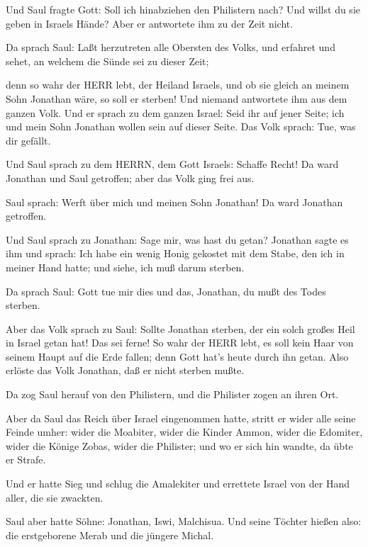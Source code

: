  Und Saul fragte Gott: Soll ich hinabziehen den Philistern
nach? Und willst du sie geben in Israels Hände? Aber er antwortete ihm
zu der Zeit nicht.

 Da sprach Saul: Laßt herzutreten alle Obersten des Volks,
und erfahret und sehet, an welchem die Sünde sei zu dieser Zeit;

 denn so wahr der HERR lebt, der Heiland Israels, und ob
sie gleich an meinem Sohn Jonathan wäre, so soll er sterben! Und niemand
antwortete ihm aus dem ganzen Volk.  Und er sprach zu dem
ganzen Israel: Seid ihr auf jener Seite; ich und mein Sohn Jonathan
wollen sein auf dieser Seite. Das Volk sprach: Tue, was dir gefällt.

 Und Saul sprach zu dem HERRN, dem Gott Israels: Schaffe
Recht! Da ward Jonathan und Saul getroffen; aber das Volk ging frei aus.

 Saul sprach: Werft über mich und meinen Sohn Jonathan! Da
ward Jonathan getroffen.

 Und Saul sprach zu Jonathan: Sage mir, was hast du getan?
Jonathan sagte es ihm und sprach: Ich habe ein wenig Honig gekostet mit
dem Stabe, den ich in meiner Hand hatte; und siehe, ich muß darum
sterben.

 Da sprach Saul: Gott tue mir dies und das, Jonathan, du
mußt des Todes sterben.

 Aber das Volk sprach zu Saul: Sollte Jonathan sterben, der
ein solch großes Heil in Israel getan hat! Das sei ferne! So wahr der
HERR lebt, es soll kein Haar von seinem Haupt auf die Erde fallen; denn
Gott hat's heute durch ihn getan. Also erlöste das Volk Jonathan, daß er
nicht sterben mußte.

 Da zog Saul herauf von den Philistern, und die Philister
zogen an ihren Ort.

 Aber da Saul das Reich über Israel eingenommen hatte,
stritt er wider alle seine Feinde umher: wider die Moabiter, wider die
Kinder Ammon, wider die Edomiter, wider die Könige Zobas, wider die
Philister; und wo er sich hin wandte, da übte er Strafe.

 Und er hatte Sieg und schlug die Amalekiter und errettete
Israel von der Hand aller, die sie zwackten.

 Saul aber hatte Söhne: Jonathan, Iswi, Malchisua. Und
seine Töchter hießen also: die erstgeborene Merab und die jüngere
Michal.

